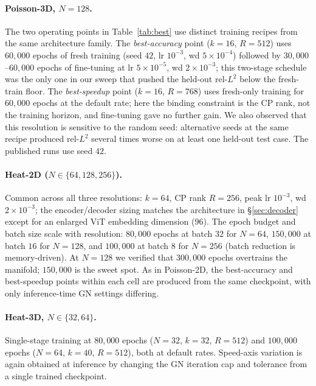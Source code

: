 \documentclass{article}
\begin{document}
\paragraph{Poisson-3D, $N{=}128$.}
The two operating points in Table~\ref{tab:best} use distinct training
recipes from the same architecture family. The \emph{best-accuracy}
point ($k{=}16$, $R{=}512$) uses $60{,}000$ epochs of fresh training
(seed $42$, lr $10^{-3}$, wd $5\times10^{-4}$) followed by
$30{,}000$--$60{,}000$ epochs of fine-tuning at lr $5\times10^{-5}$,
wd $2\times10^{-3}$; this two-stage schedule was the only one in our
sweep that pushed the held-out rel-$L^2$ below the fresh-train floor.
The \emph{best-speedup} point ($k{=}16$, $R{=}768$) uses fresh-only
training for $60{,}000$ epochs at the default rate; here the binding
constraint is the CP rank, not the training horizon, and fine-tuning
gave no further gain. We also observed that this resolution is
sensitive to the random seed: alternative seeds at the same recipe
produced rel-$L^2$ several times worse on at least one held-out test
case. The published runs use seed $42$.

\paragraph{Heat-2D ($N \in \{64, 128, 256\}$).}
Common across all three resolutions: $k{=}64$, CP rank $R{=}256$,
peak lr $10^{-3}$, wd $2\times10^{-3}$; the encoder/decoder sizing
matches the architecture in \S\ref{sec:decoder} except for an enlarged
ViT embedding dimension ($96$). The epoch budget and batch size scale
with resolution: $80{,}000$ epochs at batch $32$ for $N{=}64$,
$150{,}000$ at batch $16$ for $N{=}128$, and $100{,}000$ at batch $8$
for $N{=}256$ (batch reduction is memory-driven). At $N{=}128$ we
verified that $300{,}000$ epochs overtrains the manifold; $150{,}000$
is the sweet spot. As in Poisson-2D, the best-accuracy and
best-speedup points within each cell are produced from the same
checkpoint, with only inference-time GN settings differing.

\paragraph{Heat-3D, $N \in \{32, 64\}$.}
Single-stage training at $80{,}000$ epochs ($N{=}32$, $k{=}32$,
$R{=}512$) and $100{,}000$ epochs ($N{=}64$, $k{=}40$, $R{=}512$),
both at default rates. Speed-axis variation is again obtained at
inference by changing the GN iteration cap and tolerance from a single
trained checkpoint.
\end{document}
